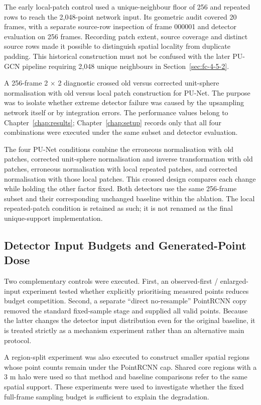 The early local-patch control used a unique-neighbour floor of
256 and repeated rows to reach the 2,048-point network input.
Its geometric audit covered 20 frames, with a separate source-row
inspection of frame 000001 and detector evaluation on 256 frames.
Recording patch extent, source coverage and distinct source rows
made it possible to distinguish spatial locality from duplicate
padding. This historical construction must not be confused with
the later PU-GCN pipeline requiring 2,048 unique neighbours in
Section~\ref{sec:fc-4-5-2}.

\label{sec:fc-4-12-2}

A 256-frame 2 \ensuremath{\times}  2 diagnostic crossed old versus corrected unit-sphere normalisation with old versus local patch construction for PU-Net. The purpose was to isolate whether extreme detector failure was caused by the upsampling network itself or by integration errors. The performance values belong to Chapter~\ref{chap:results}; Chapter~\ref{chap:setup} records only that all four combinations were executed under the same subset and detector evaluation.

The four PU-Net conditions combine the erroneous normalisation
with old patches, corrected unit-sphere normalisation and inverse
transformation with old patches, erroneous normalisation with local
repeated patches, and corrected normalisation with those local
patches. This crossed design compares each change while holding the
other factor fixed. Both detectors use the same 256-frame subset
and their corresponding unchanged baseline within the ablation.
The local repeated-patch condition is retained as such; it is not
renamed as the final unique-support implementation.

\subsection{Detector Input Budgets and Generated-Point Dose}
\label{sec:fc-4-12-3}

Two complementary controls were executed. First, an observed-first / enlarged-input experiment tested whether explicitly prioritising measured points reduces budget competition. Second, a separate ``direct no-resample'' PointRCNN copy removed the standard fixed-sample stage and supplied all valid points. Because the latter changes the detector input distribution even for the original baseline, it is treated strictly as a mechanism experiment rather than an alternative main protocol.

A region-split experiment was also executed to construct smaller spatial regions whose point counts remain under the PointRCNN cap. Shared core regions with a 3 m halo were used so that method and baseline comparisons refer to the same spatial support. These experiments were used to investigate whether the fixed full-frame sampling budget is sufficient to explain the degradation.

